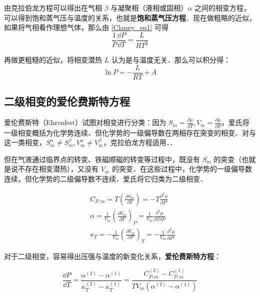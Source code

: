 由克拉伯龙方程可以得出在气相 $\beta$ 与凝聚相（液相或固相）$\alpha$ 之间的相变方程，可以得到饱和蒸气压与温度的关系，也就是\textbf{饱和蒸气压方程}．现在做粗略的近似，如果将气相看作理想气体，那么由 \autoref{Clapey_eq1} 可得
\begin{equation}
\frac{1}{P}\frac{\dd P}{\dd T}=\frac{L}{RT^2}
\end{equation}

再做更粗糙的近似，将相变潜热 $L$ 认为是与温度无关．那么可以积分得：
\begin{equation}
\ln P=-\frac{L}{RT}+A
\end{equation}

\subsection{二级相变的爱伦费斯特方程}

爱伦费斯特（Ehrenfest）试图对相变进行分类：因为 $S_m=\frac{\partial \mu}{\partial T},V_m=\frac{\partial \mu}{\partial P}$，爱氏将一级相变概括为化学势连续、但化学势的一级偏导数在两相存在突变的相变．对与这一类相变，$S_m^\alpha\neq S_m^\beta,V_m^\alpha\neq V_m^\beta$，克拉伯龙方程适用．．

但在气液通过临界点的转变、铁磁顺磁的转变等过程中，既没有 $S_m$ 的突变（也就是说不存在相变潜热），又没有 $V_m$ 的突变．在这些过程中，化学势的一级偏导数连续，但化学势的二级偏导数不连续．爱氏将它归类为二级相变．

\begin{align}
&C_{P,m}=T\left(\frac{\partial S_m}{\partial T}\right)=-T\frac{\partial^2 \mu}{\partial T^2}\\
&\alpha=\frac{1}{V_m}\left(\frac{\partial V_m}{\partial T}\right)_P
=\frac{1}{V_m}\frac{\partial^2\mu}{\partial T\partial P}\\
&\kappa_T=-\frac{1}{V_m}\left(\frac{\partial V_m}{\partial P}\right)_T
=-\frac{1}{V_m}\frac{\partial^2\mu}{\partial P^2}
\end{align}

对于二级相变，容易得出压强与温度的新变化关系，\textbf{爱伦费斯特方程}：

\begin{equation}
\frac{\dd P}{\dd T}=\frac{\alpha^{(2)}-\alpha^{(1)}}{\kappa_T^{(2)}-\kappa_T^{(1)}}=\frac{C_{P,m}^{(2)}-C_{P,m}^{(1)}}{TV_m(\alpha^{(2)}-\alpha^{(1)})}
\end{equation}